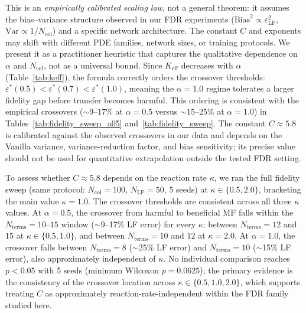 \documentclass[11pt]{article}
\newcommand{\Ncol}{N_{\mathrm{col}}}
\begin{document}
This is an \emph{empirically calibrated scaling law}, not a general theorem: it assumes the bias--variance structure observed in our FDR experiments ($\mathrm{Bias}^2 \propto \varepsilon_{\mathrm{LF}}^2$, $\mathrm{Var} \propto 1/\Ncol$) and a specific network architecture. The constant $C$ and exponents may shift with different PDE families, network sizes, or training protocols. We present it as a practitioner heuristic that captures the qualitative dependence on $\alpha$ and $\Ncol$, not as a universal bound. Since $K_{\mathrm{eff}}$ decreases with $\alpha$ (Table~\ref{tab:keff}), the formula correctly orders the crossover thresholds: $\varepsilon^*(0.5) < \varepsilon^*(0.7) < \varepsilon^*(1.0)$, meaning the $\alpha = 1.0$ regime tolerates a larger fidelity gap before transfer becomes harmful. This ordering is consistent with the empirical crossovers (${\sim}9$--$17\%$ at $\alpha = 0.5$ versus ${\sim}15$--$25\%$ at $\alpha = 1.0$) in Tables~\ref{tab:fidelity_sweep_a05} and~\ref{tab:fidelity_sweep}. The constant $C \approx 5.8$ is calibrated against the observed crossovers in our data and depends on the Vanilla variance, variance-reduction factor, and bias sensitivity; its precise value should not be used for quantitative extrapolation outside the tested FDR setting.

To assess whether $C \approx 5.8$ depends on the reaction rate $\kappa$, we ran the full fidelity sweep (same protocol: $\Ncol = 100$, $N_{\mathrm{LF}} = 50$, 5 seeds) at $\kappa \in \{0.5, 2.0\}$, bracketing the main value $\kappa = 1.0$. The crossover thresholds are consistent across all three $\kappa$ values. At $\alpha = 0.5$, the crossover from harmful to beneficial MF falls within the $N_{\mathrm{terms}} = 10$--$15$ window ($\sim$9--17\% LF error) for every $\kappa$: between $N_{\mathrm{terms}} = 12$ and $15$ at $\kappa \in \{0.5, 1.0\}$, and between $N_{\mathrm{terms}} = 10$ and $12$ at $\kappa = 2.0$. At $\alpha = 1.0$, the crossover falls between $N_{\mathrm{terms}} = 8$ ($\sim$25\% LF error) and $N_{\mathrm{terms}} = 10$ ($\sim$15\% LF error), also approximately independent of $\kappa$. No individual comparison reaches $p < 0.05$ with 5 seeds (minimum Wilcoxon $p = 0.0625$); the primary evidence is the consistency of the crossover location across $\kappa \in \{0.5, 1.0, 2.0\}$, which supports treating $C$ as approximately reaction-rate-independent within the FDR family studied here.
\end{document}
